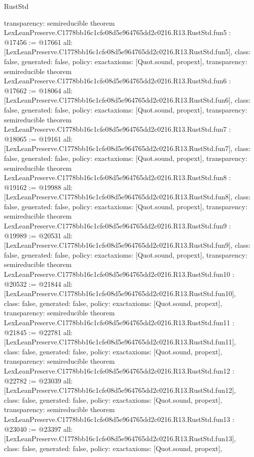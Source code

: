 \begin{lexlean}{RustStd}
\begin{coremodule}
{  transparency: semireducible
}
theorem LexLeanPreserve.C1778bb16c1cfe08d5e964765dd2c0216.R13.RustStd.fun5 : @17456 := @17661 {
  all: [LexLeanPreserve.C1778bb16c1cfe08d5e964765dd2c0216.R13.RustStd.fun5],
  class: false,
  generated: false,
  policy: exact{axioms: [Quot.sound, propext]},
  transparency: semireducible
}
theorem LexLeanPreserve.C1778bb16c1cfe08d5e964765dd2c0216.R13.RustStd.fun6 : @17662 := @18064 {
  all: [LexLeanPreserve.C1778bb16c1cfe08d5e964765dd2c0216.R13.RustStd.fun6],
  class: false,
  generated: false,
  policy: exact{axioms: [Quot.sound, propext]},
  transparency: semireducible
}
theorem LexLeanPreserve.C1778bb16c1cfe08d5e964765dd2c0216.R13.RustStd.fun7 : @18065 := @19161 {
  all: [LexLeanPreserve.C1778bb16c1cfe08d5e964765dd2c0216.R13.RustStd.fun7],
  class: false,
  generated: false,
  policy: exact{axioms: [Quot.sound, propext]},
  transparency: semireducible
}
theorem LexLeanPreserve.C1778bb16c1cfe08d5e964765dd2c0216.R13.RustStd.fun8 : @19162 := @19988 {
  all: [LexLeanPreserve.C1778bb16c1cfe08d5e964765dd2c0216.R13.RustStd.fun8],
  class: false,
  generated: false,
  policy: exact{axioms: [Quot.sound, propext]},
  transparency: semireducible
}
theorem LexLeanPreserve.C1778bb16c1cfe08d5e964765dd2c0216.R13.RustStd.fun9 : @19989 := @20531 {
  all: [LexLeanPreserve.C1778bb16c1cfe08d5e964765dd2c0216.R13.RustStd.fun9],
  class: false,
  generated: false,
  policy: exact{axioms: [Quot.sound, propext]},
  transparency: semireducible
}
theorem LexLeanPreserve.C1778bb16c1cfe08d5e964765dd2c0216.R13.RustStd.fun10 : @20532 := @21844 {
  all: [LexLeanPreserve.C1778bb16c1cfe08d5e964765dd2c0216.R13.RustStd.fun10],
  class: false,
  generated: false,
  policy: exact{axioms: [Quot.sound, propext]},
  transparency: semireducible
}
theorem LexLeanPreserve.C1778bb16c1cfe08d5e964765dd2c0216.R13.RustStd.fun11 : @21845 := @22781 {
  all: [LexLeanPreserve.C1778bb16c1cfe08d5e964765dd2c0216.R13.RustStd.fun11],
  class: false,
  generated: false,
  policy: exact{axioms: [Quot.sound, propext]},
  transparency: semireducible
}
theorem LexLeanPreserve.C1778bb16c1cfe08d5e964765dd2c0216.R13.RustStd.fun12 : @22782 := @23039 {
  all: [LexLeanPreserve.C1778bb16c1cfe08d5e964765dd2c0216.R13.RustStd.fun12],
  class: false,
  generated: false,
  policy: exact{axioms: [Quot.sound, propext]},
  transparency: semireducible
}
theorem LexLeanPreserve.C1778bb16c1cfe08d5e964765dd2c0216.R13.RustStd.fun13 : @23040 := @23397 {
  all: [LexLeanPreserve.C1778bb16c1cfe08d5e964765dd2c0216.R13.RustStd.fun13],
  class: false,
  generated: false,
  policy: exact{axioms: [Quot.sound, propext]},
}
\end{coremodule}
\end{lexlean}
